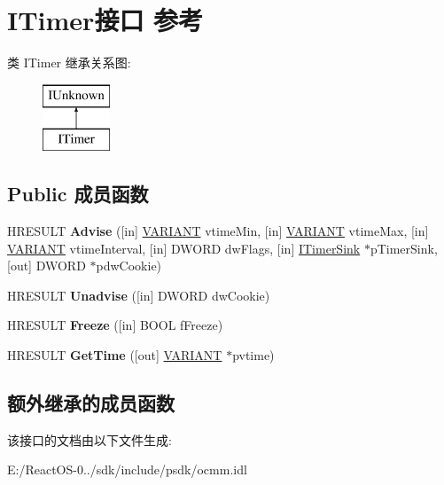 \hypertarget{interface_i_timer}{}\section{I\+Timer接口 参考}
\label{interface_i_timer}
类 I\+Timer 继承关系图\+:\begin{figure}[H]
\begin{center}
\leavevmode
\includegraphics[height=2.000000cm]{interface_i_timer}
\end{center}
\end{figure}
\subsection*{Public 成员函数}
\begin{DoxyCompactItemize}
\item 
\mbox{\label{interface_i_timer_aafe50639ebe499723371718a0e18ccb2}} 
H\+R\+E\+S\+U\+LT {\bfseries Advise} (\mbox{[}in\mbox{]} \hyperlink{structtag_v_a_r_i_a_n_t}{V\+A\+R\+I\+A\+NT} vtime\+Min, \mbox{[}in\mbox{]} \hyperlink{structtag_v_a_r_i_a_n_t}{V\+A\+R\+I\+A\+NT} vtime\+Max, \mbox{[}in\mbox{]} \hyperlink{structtag_v_a_r_i_a_n_t}{V\+A\+R\+I\+A\+NT} vtime\+Interval, \mbox{[}in\mbox{]} D\+W\+O\+RD dw\+Flags, \mbox{[}in\mbox{]} \hyperlink{interface_i_timer_sink}{I\+Timer\+Sink} $\ast$p\+Timer\+Sink, \mbox{[}out\mbox{]} D\+W\+O\+RD $\ast$pdw\+Cookie)
\item 
\mbox{\label{interface_i_timer_a33574e23c47553eb8b53358da443c7e7}} 
H\+R\+E\+S\+U\+LT {\bfseries Unadvise} (\mbox{[}in\mbox{]} D\+W\+O\+RD dw\+Cookie)
\item 
\mbox{\label{interface_i_timer_a1425ae16affe1e11be8f823c0c99de72}} 
H\+R\+E\+S\+U\+LT {\bfseries Freeze} (\mbox{[}in\mbox{]} B\+O\+OL f\+Freeze)
\item 
\mbox{\label{interface_i_timer_acda4e1ee66bcc693b3fc55a7221c9462}} 
H\+R\+E\+S\+U\+LT {\bfseries Get\+Time} (\mbox{[}out\mbox{]} \hyperlink{structtag_v_a_r_i_a_n_t}{V\+A\+R\+I\+A\+NT} $\ast$pvtime)
\end{DoxyCompactItemize}
\subsection*{额外继承的成员函数}


该接口的文档由以下文件生成\+:\begin{DoxyCompactItemize}
\item 
E\+:/\+React\+O\+S-\/0../sdk/include/psdk/ocmm.\+idl\end{DoxyCompactItemize}

